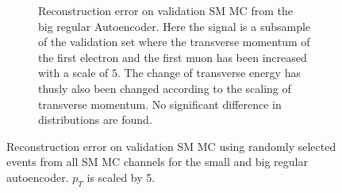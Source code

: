 \begin{figure}[h!]
\begin{subfigure}{.45\textwidth}
        \caption{Reconstruction error on validation SM MC from the big regular Autoencoder. Here the signal is a subsample of the validation 
        set where the transverse momentum of the first electron and the first muon has been increased with a scale of $5$. The change of transverse 
        energy has thusly also been changed according to the scaling of transverse momentum. No significant difference in distributions are found. }
        \label{fig:ae_big_pt_5}
    \end{subfigure}
    \hfill 
    \caption[AE | Reconstruction error $p_T$ altering of 5]{Reconstruction error on validation SM MC using randomly selected events from all SM MC channels for the small and big regular autoencoder. 
    $p_T$ is scaled by 5. }
    \label{fig:ae_big_small_pt_5}
\end{figure}


